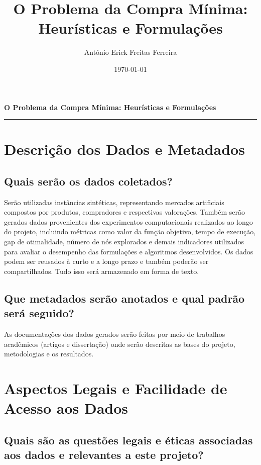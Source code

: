 \documentclass[11pt]{article}
\title{O Problema da Compra Mínima: Heurísticas e Formulações}
\author{Antônio Erick Freitas Ferreira}
\date{\today}
\begin{document}

\begin{center}
    {\LARGE \bfseries O Problema da Compra Mínima: Heurísticas e Formulações}
    \rule{\textwidth}{0.4pt}
\end{center}

\section*{Descrição dos Dados e Metadados}

\subsection*{Quais serão os dados coletados?}

Serão utilizadas instâncias sintéticas, representando mercados artificiais compostos por produtos, compradores e respectivas valorações. Também serão gerados dados provenientes dos experimentos computacionais realizados ao longo do projeto, incluindo métricas como valor da função objetivo, tempo de execução, gap de otimalidade, número de nós explorados e demais indicadores utilizados para avaliar o desempenho das formulações e algoritmos desenvolvidos. Os dados podem ser reusados à curto e a longo prazo e também poderão ser compartilhados. Tudo isso será armazenado em forma de texto.

\subsection*{Que metadados serão anotados e qual padrão será seguido?}

As documentações dos dados gerados serão feitas por meio de trabalhos acadêmicos (artigos e
dissertação) onde serão descritas as bases do projeto, metodologias e os resultados.

\section*{Aspectos Legais e Facilidade de Acesso aos Dados}

\subsection*{Quais são as questões legais e éticas associadas aos dados e relevantes a este projeto?}
\end{document}
